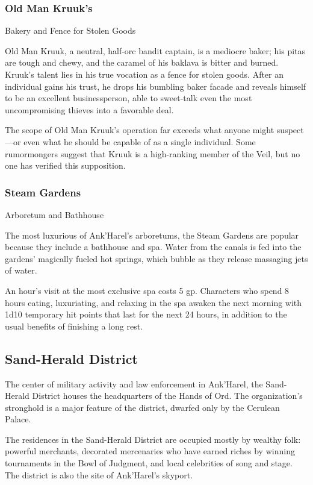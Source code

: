 \documentclass[10pt,a4paper,twoside,bg=print,twocolumn,openany,nodeprecatedcode]{dndbook}
\begin{document}
\subsubsection{Old Man Kruuk's}
Bakery and Fence for Stolen Goods

Old Man Kruuk, a neutral, half-orc bandit captain, is a mediocre baker; his pitas are tough and chewy, and the caramel of his baklava is bitter and burned. Kruuk's talent lies in his true vocation as a fence for stolen goods. After an individual gains his trust, he drops his bumbling baker facade and reveals himself to be an excellent businessperson, able to sweet-talk even the most uncompromising thieves into a favorable deal.

The scope of Old Man Kruuk's operation far exceeds what anyone might suspect—or even what he should be capable of as a single individual. Some rumormongers suggest that Kruuk is a high-ranking member of the Veil, but no one has verified this supposition.

\subsubsection{Steam Gardens}
Arboretum and Bathhouse

The most luxurious of Ank'Harel's arboretums, the Steam Gardens are popular because they include a bathhouse and spa. Water from the canals is fed into the gardens' magically fueled hot springs, which bubble as they release massaging jets of water.

An hour's visit at the most exclusive spa costs 5 gp. Characters who spend 8 hours eating, luxuriating, and relaxing in the spa awaken the next morning with 1d10 temporary hit points that last for the next 24 hours, in addition to the usual benefits of finishing a long rest.

\subsection{Sand-Herald District}
The center of military activity and law enforcement in Ank'Harel, the Sand-Herald District houses the headquarters of the Hands of Ord. The organization's stronghold is a major feature of the district, dwarfed only by the Cerulean Palace.

The residences in the Sand-Herald District are occupied mostly by wealthy folk: powerful merchants, decorated mercenaries who have earned riches by winning tournaments in the Bowl of Judgment, and local celebrities of song and stage. The district is also the site of Ank'Harel's skyport.
\end{document}

